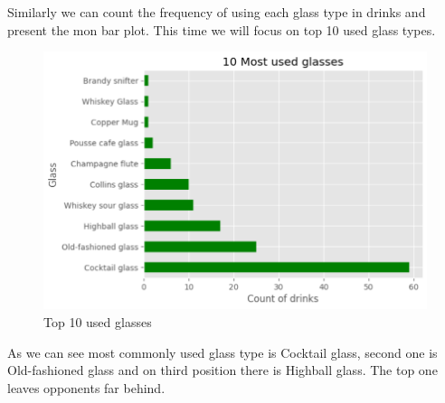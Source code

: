 \documentclass[a4paper]{article}
\begin{document}
Similarly we can count the frequency of using each glass type in drinks and present the mon bar plot. This time we will focus on top 10 used glass types.

\begin{figure}[H]
    \centering
    \includegraphics[width=0.9\linewidth]{glass types.png}
    \caption{Top 10 used glasses}
    \label{fig:enter-label}
\end{figure}

As we can see most commonly used glass type is Cocktail glass, second one is Old-fashioned glass and on third position there is Highball glass. The top one leaves opponents far behind.
\end{document}
